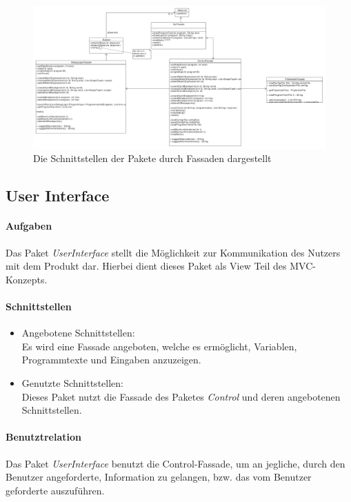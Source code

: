 \documentclass[parskip=full]{scrartcl}
\begin{document}
\newpage

\begin{landscape}

\begin{figure}[!h]
\centering
\includegraphics[scale=0.4]{diagrammIdeenUmlet/fassaden.pdf}
\caption{Die Schnittstellen der Pakete durch Fassaden dargestellt}
\label{fig:fassaden}
\end{figure}
\end{landscape}

\newpage

\subsection{User Interface}
\paragraph{Aufgaben} Das Paket \textit{UserInterface} stellt die Möglichkeit zur Kommunikation des Nutzers mit dem Produkt dar. Hierbei dient dieses Paket als View Teil des MVC-Konzepts.
\paragraph{Schnittstellen} 
\begin{itemize}
\item Angebotene Schnittstellen:\\
Es wird eine Fassade angeboten, welche es ermöglicht, Variablen, Programmtexte und Eingaben anzuzeigen.
\item Genutzte Schnittstellen:\\
Dieses Paket nutzt die Fassade des Paketes \textit{Control} und deren angebotenen Schnittstellen.
\end{itemize}
\paragraph{Benutztrelation} Das Paket \textit{UserInterface} benutzt die Control-Fassade, um an jegliche, durch den Benutzer angeforderte, Information zu gelangen, bzw. das vom Benutzer geforderte auszuführen. %
\end{document}

